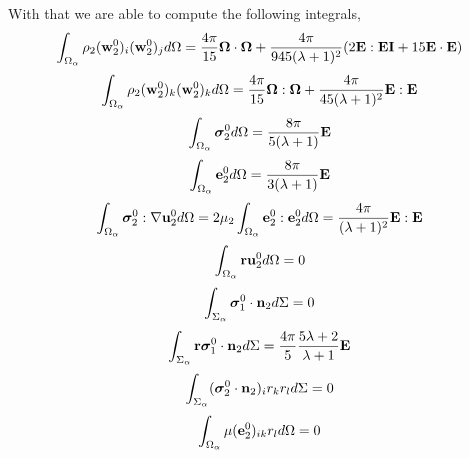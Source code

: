 With that we are able to compute the following integrals,
\begin{equation*}
    \int_{\Omega_\alpha} \rho_2(\textbf{w}_2^0)_i (\textbf{w}_2^0)_j d\Omega
    = \frac{4\pi}{15}\bm\Omega\cdot\bm\Omega
    + \frac{4\pi}{945(\lambda+1)^2}
    (2\textbf{E}:\textbf{EI} + 15 \textbf{E}\cdot \textbf{E})
\end{equation*}
\begin{equation*}
    \int_{\Omega_\alpha} \rho_2(\textbf{w}_2^0)_k (\textbf{w}_2^0)_k d\Omega
    = \frac{4\pi}{15}\bm\Omega:\bm\Omega
    + \frac{4\pi}{45(\lambda+1)^2}
    \textbf{E}:\textbf{E} 
\end{equation*} 
\begin{equation*}
    \int_{\Omega_\alpha} \bm\sigma_2^0 d\Omega
    = \frac{8\pi}{5(\lambda+1)}
    \textbf{E}
\end{equation*}
\begin{equation*}
    \int_{\Omega_\alpha} \textbf{e}_2^0 d\Omega
    = \frac{8\pi}{3(\lambda+1)}
    \textbf{E}
\end{equation*}
\begin{equation*}
    \int_{\Omega_\alpha} \bm{\sigma}_2^0:\mathbf{\nabla} \textbf{u}_2^0 d\Omega
    = 2\mu_2 \int_{\Omega_\alpha} \textbf{e}_2^0: \textbf{e}_2^0  d\Omega
    = 
    \frac{4\pi}{(\lambda+1)^2}\textbf{E}:\textbf{E}
\end{equation*}
\begin{align*}
    \int_{\Omega_\alpha} \textbf{r}\textbf{u}_2^0 d\Omega
    = 0 
\end{align*}
\begin{equation*}
    \int_{\Sigma_\alpha} \bm\sigma_1^0\cdot \textbf{n}_2 d\Sigma
    = 0
\end{equation*}
\begin{equation*}
    \int_{\Sigma_\alpha} \textbf{r}\bm\sigma_1^0\cdot \textbf{n}_2 d\Sigma
    = \frac{4\pi}{5}\frac{5\lambda+2}{\lambda+1}\textbf{E} 
\end{equation*}
\begin{equation*}
    \int_{\Sigma_\alpha} (\bm\sigma_2^0\cdot \textbf{n}_2)_i r_kr_l d\Sigma
    = 0
\end{equation*}
\begin{equation*}
    \int_{\Omega_\alpha} \mu(\textbf{e}_2^0)_{ik} r_l d\Omega =
    0
\end{equation*}